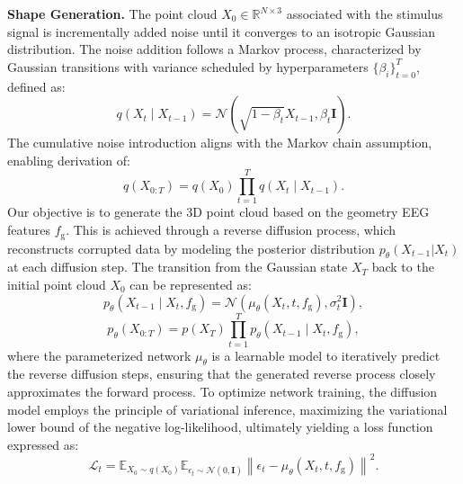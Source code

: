 \textbf{Shape Generation.}
The point cloud $X_0\in \mathbb{R}^{N\times 3}$ associated with the stimulus signal is incrementally added noise until it converges to an isotropic Gaussian distribution. The noise addition follows a Markov process, characterized by Gaussian transitions with variance scheduled by hyperparameters $\{\beta_i\}_{t=0}^T$, defined as:
\begin{equation}
	q\left(X_t \mid X_{t-1}\right)=\mathcal{N}\left(\sqrt{1-\beta_t} X_{t-1}, \beta_t \mathbf{I}\right).
\end{equation}
The cumulative noise introduction aligns with the Markov chain assumption, enabling derivation of:
\begin{equation}
	q\left(X_{0: T}\right)=q\left(X_0\right) \prod_{t=1}^T q\left(X_t \mid X_{t-1}\right).
\end{equation}
Our objective is to generate the 3D point cloud based on the geometry EEG features $f_\mathrm{g}$. This is achieved through a reverse diffusion process, which reconstructs corrupted data by modeling the posterior distribution $p_\theta(X_{t-1}|X_t)$ at each diffusion step. The transition from the Gaussian state $X_T$ back to the initial point cloud $X_0$ can be represented as:
\begin{equation}
	p_\theta\left(X_{t-1} \mid X_t, f_\mathrm{g}\right)=\mathcal{N}\left(\mu_\theta\left(X_t, t, f_\mathrm{g}\right), \sigma_t^2 \mathbf{I}\right),
\end{equation}
\begin{equation}
	p_\theta\left(X_{0: T}\right)=p\left(X_T\right) \prod_{t=1}^T p_\theta\left(X_{t-1} \mid X_t, f_\mathrm{g}\right),
	\label{denoised}
\end{equation}
where the parameterized network $\mu_\theta$ is a learnable model to iteratively predict the reverse diffusion steps, ensuring that the generated reverse process closely approximates the forward process. To optimize network training, the diffusion model employs the principle of variational inference, maximizing the variational lower bound of the negative log-likelihood, ultimately yielding a loss function expressed as:
\begin{equation}
	\mathcal{L}_t=\mathbb{E}_{X_0\sim q(X_0)}\mathbb{E}_{\epsilon_t\sim \mathcal{N}(0, \mathbf{I})}\left\|\epsilon_t-\mu_\theta\left(X_t, t, f_\mathrm{g}\right)\right\|^2.
\end{equation}


